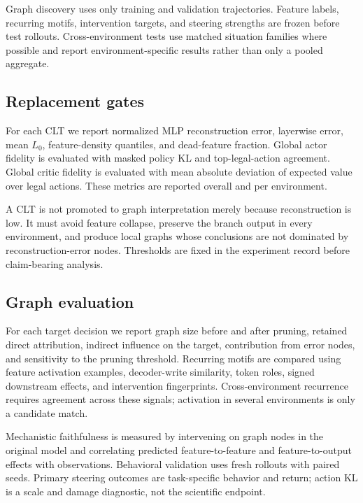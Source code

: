 Graph discovery uses only training and validation trajectories. Feature labels, recurring motifs, intervention targets, and steering strengths are frozen before test rollouts. Cross-environment tests use matched situation families where possible and report environment-specific results rather than only a pooled aggregate.

\subsection{Replacement gates}

For each CLT we report normalized MLP reconstruction error, layerwise error, mean $L_0$, feature-density quantiles, and dead-feature fraction. Global actor fidelity is evaluated with masked policy KL and top-legal-action agreement. Global critic fidelity is evaluated with mean absolute deviation of expected value over legal actions. These metrics are reported overall and per environment.

A CLT is not promoted to graph interpretation merely because reconstruction is low. It must avoid feature collapse, preserve the branch output in every environment, and produce local graphs whose conclusions are not dominated by reconstruction-error nodes. Thresholds are fixed in the experiment record before claim-bearing analysis.

\subsection{Graph evaluation}

For each target decision we report graph size before and after pruning, retained direct attribution, indirect influence on the target, contribution from error nodes, and sensitivity to the pruning threshold. Recurring motifs are compared using feature activation examples, decoder-write similarity, token roles, signed downstream effects, and intervention fingerprints. Cross-environment recurrence requires agreement across these signals; activation in several environments is only a candidate match.

Mechanistic faithfulness is measured by intervening on graph nodes in the original model and correlating predicted feature-to-feature and feature-to-output effects with observations. Behavioral validation uses fresh rollouts with paired seeds. Primary steering outcomes are task-specific behavior and return; action KL is a scale and damage diagnostic, not the scientific endpoint.

